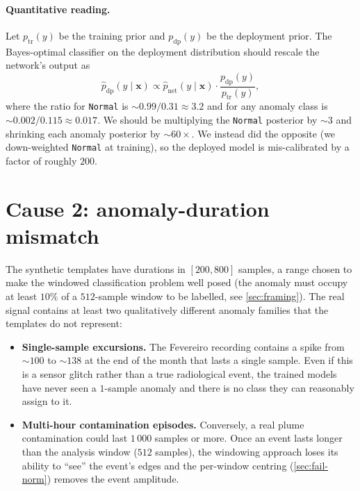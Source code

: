 \paragraph{Quantitative reading.}
Let $p_{\text{tr}}(y)$ be the training prior and $p_{\text{dp}}(y)$ be
the deployment prior. The Bayes-optimal classifier on the deployment
distribution should rescale the network's output as
\begin{equation}
    \hat{p}_{\text{dp}}(y \mid \mathbf{x}) \propto
    \hat{p}_{\text{net}}(y \mid \mathbf{x}) \cdot \frac{p_{\text{dp}}(y)}{p_{\text{tr}}(y)},
    \label{eq:prior-correction}
\end{equation}
where the ratio for \texttt{Normal} is $\sim 0.99 / 0.31 \approx 3.2$
and for any anomaly class is $\sim 0.002 / 0.115 \approx 0.017$. We
should be multiplying the \texttt{Normal} posterior by $\sim 3$ and
shrinking each anomaly posterior by $\sim 60\times$. We instead did
the opposite (we down-weighted \texttt{Normal} at training), so the
deployed model is mis-calibrated by a factor of roughly $200$.

\section{Cause 2: anomaly-duration mismatch}
\label{sec:fail-duration}

The synthetic templates have durations in $[200, 800]$ samples, a range
chosen to make the windowed classification problem well posed (the
anomaly must occupy at least $10\%$ of a $512$-sample window to be
labelled, see \cref{sec:framing}). The real signal contains at least
two qualitatively different anomaly families that the templates do not
represent:

\begin{itemize}[leftmargin=*, itemsep=0.2em]
    \item \textbf{Single-sample excursions.} The Fevereiro recording
    contains a spike from $\sim 100$ to $\sim 138$ at the end of the
    month that lasts a single sample. Even if this is a sensor
    glitch rather than a true radiological event, the trained models
    have never seen a $1$-sample anomaly and there is no class they can
    reasonably assign to it.
    \item \textbf{Multi-hour contamination episodes.} Conversely, a
    real plume contamination could last $1\,000$ samples or more.
    Once an event lasts longer than the analysis window ($512$
    samples), the windowing approach loses its ability to ``see'' the
    event's edges and the per-window centring (\cref{sec:fail-norm})
    removes the event amplitude.
\end{itemize}

